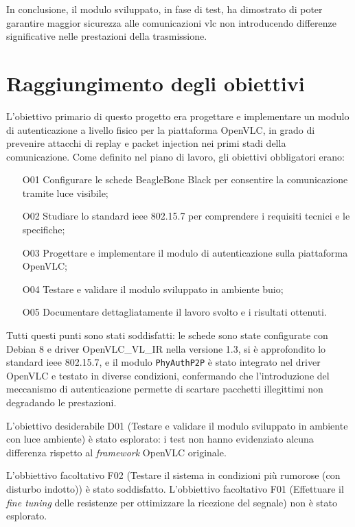 In conclusione, il modulo sviluppato, in fase di test, ha dimostrato di poter garantire maggior sicurezza alle comunicazioni \gls{vlc} non introducendo differenze significative nelle prestazioni della trasmissione.\\

\section{Raggiungimento degli obiettivi}
L'obiettivo primario di questo progetto era progettare e implementare un modulo di autenticazione a livello fisico per la piattaforma OpenVLC, in grado di prevenire attacchi di replay e packet injection nei primi stadi della comunicazione. Come definito nel piano di lavoro, gli obiettivi obbligatori erano:
\begin{itemize}
  \item[O01] Configurare le schede BeagleBone Black per consentire la comunicazione tramite luce visibile;
  \item[O02] Studiare lo standard \gls{ieee} 802.15.7 per comprendere i requisiti tecnici e le specifiche;
  \item[O03] Progettare e implementare il modulo di autenticazione sulla piattaforma OpenVLC;
  \item[O04] Testare e validare il modulo sviluppato in ambiente buio;
  \item[O05] Documentare dettagliatamente il lavoro svolto e i risultati ottenuti.
\end{itemize}
Tutti questi punti sono stati soddisfatti: le schede sono state configurate con Debian 8 e driver OpenVLC\_VL\_IR nella versione 1.3, si è approfondito lo standard \gls{ieee} 802.15.7, e il modulo \texttt{PhyAuthP2P} è stato integrato nel driver OpenVLC e testato in diverse condizioni, confermando che l'introduzione del meccanismo di autenticazione permette di scartare pacchetti illegittimi non degradando le prestazioni.

L'obiettivo desiderabile D01 (Testare e validare il modulo sviluppato in ambiente con luce ambiente) è stato esplorato: i test non hanno evidenziato alcuna differenza rispetto al \textit{framework} OpenVLC originale.

L'obbiettivo facoltativo F02 (Testare il sistema in condizioni più rumorose (con disturbo indotto)) è stato soddisfatto.
L'obbiettivo facoltativo F01 (Effettuare il \textit{fine tuning} delle resistenze per ottimizzare la ricezione del segnale) non è stato esplorato.

